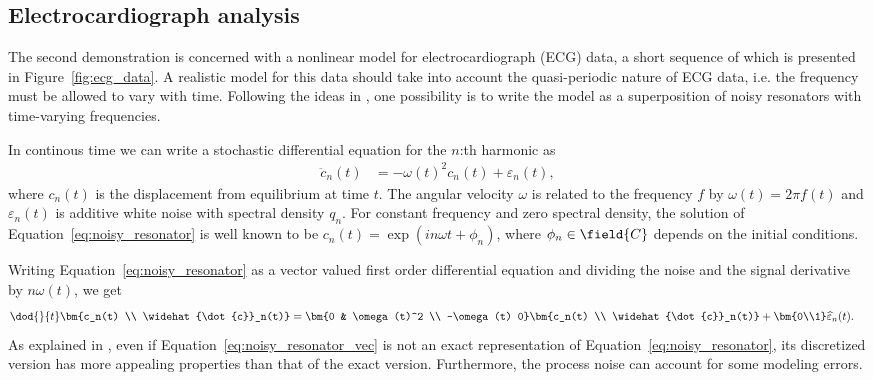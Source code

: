 \subsection{Electrocardiograph analysis}

The second demonstration is concerned with a nonlinear model for
electrocardiograph (ECG) data, a short sequence of which is presented
in Figure~\ref{fig:ecg_data}. A realistic model for this data 
should take into account the quasi-periodic nature of ECG data,
i.e. the frequency must be allowed to vary with time.
Following the ideas in \textcite{Sarkka2012}, one possibility
is to write the model as a superposition of noisy resonators
with time-varying frequencies.

In continous time we can write a stochastic differential equation
for the $n$:th harmonic as
\begin{align}
	 \ddot{c}_n(t)&= -\omega(t)^2c_n(t)+\varepsilon_n(t),
	\label{eq:noisy_resonator}
\end{align}
where $c_n(t)$ is the displacement from equilibrium at time $t$.
The angular velocity $\omega$ is related to the frequency $f$
by $\omega(t)=2\pi f(t)$ and  $\varepsilon_n(t)$ is additive
white noise with spectral density $q_n$. For constant frequency and
zero spectral density, the solution of Equation~\eqref{eq:noisy_resonator}
is well known to be $c_n(t)=\exp(i n \omega t+\phi_n)$, where $\phi_n\in\field{C}$ depends on 
the initial conditions.

Writing Equation~\eqref{eq:noisy_resonator} as a vector valued first order differential equation
and dividing the noise and the signal derivative by $n\omega(t)$, we get
\begin{align}
	\dod{}{t}\bm{c_n(t) \\ \widehat{\dot{c}}_n(t)} &= \bm{0 & \omega(t)^2 \\ -\omega(t) 0}\bm{c_n(t) \\
	\widehat{\dot{c}}_n(t)}+\bm{0\\1}
	\widehat{\varepsilon}_n(t).
	\label{eq:noisy_resonator_vec}
\end{align}
As explained in \textcite{Sarkka2012}, even if Equation~\eqref{eq:noisy_resonator_vec} is not an exact
representation of Equation~\eqref{eq:noisy_resonator}, its discretized version has more appealing
properties than that of the exact version. Furthermore, the process noise can account for some
modeling errors. 

